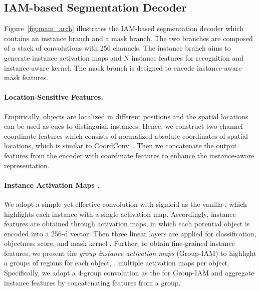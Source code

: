 \documentclass[10pt,twocolumn,letterpaper]{article}
\begin{document}
\subsection{IAM-based Segmentation Decoder}
Figure~\ref{fig:main_arch} illustrates the IAM-based segmentation decoder which contains an instance branch and a mask branch. The two branches are composed of a stack of  convolutions with 256 channels. The instance branch aims to generate instance activation maps and N instance features for recognition and instance-aware kernel. The mask branch is designed to encode instance-aware mask features. 


\paragraph{Location-Sensitive Features.}
\label{sec:location_sensitive}
Empirically, objects are localized in different positions and the spatial locations can be used as cues to distinguish instances.
Hence, we construct two-channel coordinate features which consists of normalized absolute  coordinates of spatial locations, which is similar to CoordConv~\cite{CoordConvLiuLMSFSY18}. Then we concatenate the output features from the encoder with coordinate features to enhance the instance-aware representation.

\paragraph{Instance Activation Maps .}
We adopt a simple yet effective  convolution with sigmoid as the vanilla , which highlights each instance with a single activation map.
Accordingly, instance features  are obtained through activation maps, in which each potential object is encoded into a 256-d vector.
Then three linear layers are applied for classification, objectness score, and mask kernel .
Further, to obtain fine-grained instance features, we present the \textit{group instance activation maps} (Group-IAM) to highlight a groups of regions for each object, \ie, multiple activation maps per object.
Specifically, we adopt a 4-group  convolution as the  for Group-IAM and aggregate instance features by concatenating features from a group.
\end{document}
